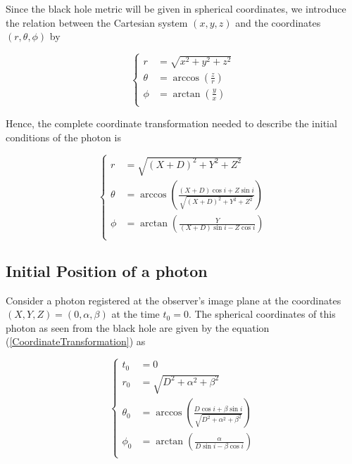 Since the black hole metric will be given in spherical coordinates, we introduce the relation between the Cartesian system $(x,y,z)$ and the coordinates $(r,\theta, \phi)$ by

\begin{equation}
\begin{cases}
r &= \sqrt{x^2 + y^2 + z^2} \\
\theta &= \arccos \left( \frac{z}{r}\right)\\
\phi &= \arctan \left( \frac{y}{x} \right) \\
\end{cases}
\end{equation}

Hence, the complete coordinate transformation needed to describe the initial conditions of the photon is 

\begin{equation}
\begin{cases}
r &= \sqrt{(X+D)^2 + Y^2 + Z^2} \\
\theta &= \arccos \left( \frac{(X+D) \cos i + Z \sin i}{\sqrt{(X+D)^2 + Y^2 + Z^2}}\right)\\
\phi &= \arctan \left( \frac{Y}{(X+D)\sin i - Z \cos i} \right) \\
\end{cases} \label{CoordinateTransformation}
\end{equation}

\subsection{Initial Position of a photon}

Consider a photon registered at the observer's image plane at the coordinates $(X,Y,Z) = (0, \alpha, \beta)$ at the time $t_0 = 0$. The spherical coordinates of this photon as seen from the black hole are given by the equation (\ref{CoordinateTransformation}) as

\begin{equation}
\begin{cases}
t_0 &= 0\\
r_0 &= \sqrt{D^2 + \alpha^2 + \beta^2} \\
\theta_0 &= \arccos \left( \frac{D \cos i + \beta \sin i}{\sqrt{D^2 + \alpha^2 + \beta^2}}\right)\\
\phi_0 &= \arctan \left( \frac{\alpha}{D\sin i - \beta \cos i} \right) \\
\end{cases} 
\end{equation}

